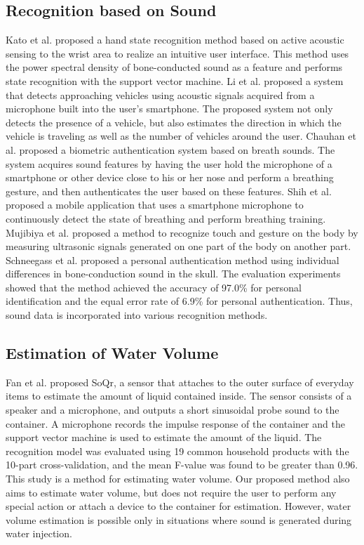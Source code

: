 \documentclass[sigconf]{acmart}
\begin{document}
\subsection{Recognition based on Sound}
Kato et al. \cite{sound_sensing1} proposed a hand state recognition method based on active acoustic sensing to the wrist area to realize an intuitive user interface. This method uses the power spectral density of bone-conducted sound as a feature and performs state recognition with the support vector machine.
Li et al. \cite{Auto++} proposed a system that detects approaching vehicles using acoustic signals acquired from a microphone built into the user's smartphone. The proposed system not only detects the presence of a vehicle, but also estimates the direction in which the vehicle is traveling as well as the number of vehicles around the user.
Chauhan et al. \cite{BreathPrint} proposed a biometric authentication system based on breath sounds. The system acquires sound features by having the user hold the microphone of a smartphone or other device close to his or her nose and perform a breathing gesture, and then authenticates the user based on these features.
Shih et al. \cite{Breeze} proposed a mobile application that uses a smartphone microphone to continuously detect the state of breathing and perform breathing training.
Mujibiya et al. \cite{sound_sensing2} proposed a method to recognize touch and gesture on the body by measuring ultrasonic signals generated on one part of the body on another part.
Schneegass et al. \cite{SkullConduct} proposed a personal authentication method using individual differences in bone-conduction sound in the skull. The evaluation experiments showed that the method achieved the accuracy of 97.0\% for personal identification and the equal error rate of 6.9\% for personal authentication.
Thus, sound data is incorporated into various recognition methods.


\subsection{Estimation of Water Volume}
Fan et al. \cite{SoQr} proposed SoQr, a sensor that attaches to the outer surface of everyday items to estimate the amount of liquid contained inside. The sensor consists of a speaker and a microphone, and outputs a short sinusoidal probe sound to the container. A microphone records the impulse response of the container and the support vector machine is used to estimate the amount of the liquid. The recognition model was evaluated using 19 common household products with the 10-part cross-validation, and the mean F-value was found to be greater than 0.96.
This study is a method for estimating water volume. Our proposed method also aims to estimate water volume, but does not require the user to perform any special action or attach a device to the container for estimation. However, water volume estimation is possible only in situations where sound is generated during water injection.
\end{document}
